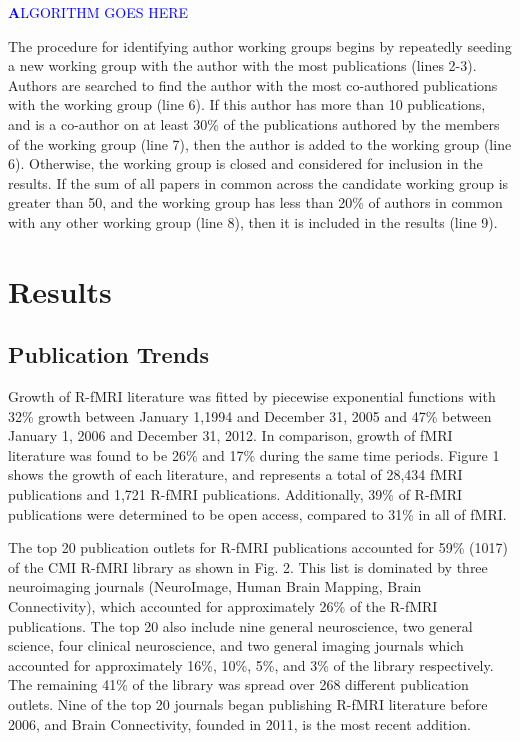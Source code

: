 \documentclass[12pt,3p,review,number]{elsarticle}
\begin{document}
\textcolor{blue}{\textbf ALGORITHM GOES HERE}

The procedure for identifying author working groups begins by repeatedly seeding
a new working group with the author with the most publications (lines 2-3).
Authors are searched to find the author with the most co-authored publications
with the working group (line 6). If this author has more than 10 publications,
and is a co-author on at least 30\% of the publications authored by the members
of the working group (line 7), then the author is added to the working group
(line 6). Otherwise, the working group is closed and considered for inclusion in
the results. If the sum of all papers in common across the candidate working
group is greater than 50, and the working group has less than 20\% of authors in
common with any other working group (line 8), then it is included in the results
(line 9).


\section{Results}

\subsection{Publication Trends}
Growth of R-fMRI literature was fitted by piecewise exponential functions with
32\% growth between January 1,1994 and December 31, 2005 and 47\% between January
1, 2006 and December 31, 2012. In comparison, growth of fMRI literature was
found to be 26\% and 17\% during the same time periods. Figure 1 shows the growth
of each literature, and represents a total of 28,434 fMRI publications and 1,721
R-fMRI publications. Additionally, 39\% of R-fMRI publications were determined to
be open access, compared to 31\% in all of fMRI.



The top 20 publication outlets for R-fMRI publications accounted for 59\% (1017)
of the CMI R-fMRI library as shown in Fig. 2. This list is dominated by three
neuroimaging journals (NeuroImage, Human Brain Mapping, Brain Connectivity),
which accounted for approximately 26\% of the R-fMRI publications. The top 20
also include nine general neuroscience, two general science, four clinical
neuroscience, and two general imaging journals which accounted for approximately
16\%, 10\%, 5\%, and 3\% of the library respectively. The remaining 41\% of the
library was spread over 268 different publication outlets. Nine of the top 20
journals began publishing R-fMRI literature before 2006, and Brain Connectivity,
founded in 2011, is the most recent addition.  
\end{document}

